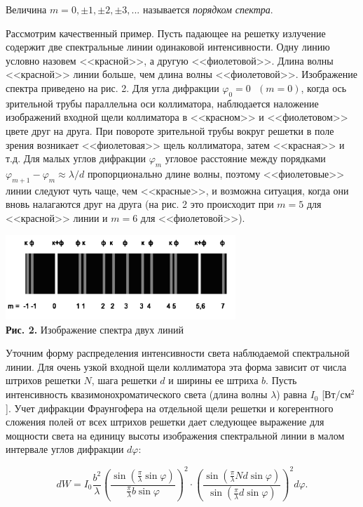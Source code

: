 \documentclass[a4paper,12pt]{article} %
\begin{document}
\hfill \break Величина $m = 0, \pm 1, \pm 2, \pm 3, ...$ называется \textit{порядком спектра}.

\hfill \break Рассмотрим качественный пример. Пусть падающее на решетку излучение содержит две спектральные линии одинаковой интенсивности. Одну линию условно назовем <<красной>>, а другую <<фиолетовой>>. Длина волны <<красной>> линии больше, чем длина волны <<фиолетовой>>. Изображение спектра приведено на рис. 2. Для угла дифракции $\varphi_{0} = 0 \text{ } (m = 0)$, когда ось зрительной трубы параллельна оси коллиматора, наблюдается наложение изображений входной щели коллиматора в <<красном>> и <<фиолетовом>> цвете друг на друга. При повороте зрительной трубы вокруг решетки в поле зрения возникает <<фиолетовая>> щель коллиматора, затем <<красная>> и т.д. Для малых углов дифракции $\varphi_{m}$ угловое расстояние между порядками $\varphi_{m+1} - \varphi_{m} \approx \lambda/d$ пропорционально длине волны, поэтому <<фиолетовые>> линии следуют чуть чаще, чем <<красные>>, и возможна ситуация, когда они вновь налагаются друг на друга (на рис. 2 это происходит при  $m = 5$ для <<красной>> линии и $m = 6$ для <<фиолетовой>>).

\begin{center}
\includegraphics[width=0.65\textwidth]{4.4.1_2.png}\\
\textbf{Рис. 2.}  Изображение спектра двух линий\\ 
\end{center}

\hfill \break Уточним форму распределения интенсивности света наблюдаемой спектральной линии. Для очень узкой входной щели коллиматора эта форма зависит от числа штрихов решетки $N$, шага решетки $d$ и ширины ее штриха $b$. Пусть интенсивность квазимонохроматического света (длина волны $\lambda$) равна $I_{0}$ [Вт/$\text{см}^2$]. Учет дифракции Фраунгофера на отдельной щели решетки и когерентного сложения полей от всех штрихов решетки дает следующее выражение для мощности света на единицу высоты изображения спектральной линии в малом интервале углов дифракции $d\varphi$:

$$
dW = I_{0} \frac{b^2}{\lambda} \left( \frac{\sin{\left(\frac{\pi}{\lambda}\sin{\varphi} \right)}}{\frac{\pi}{\lambda} b\sin{\varphi}}\right)^2 \cdot \left( \frac{ \sin{ \left( \frac{\pi}{\lambda} Nd\sin{\varphi} \right) } } { \sin{ \left( \frac{\pi}{\lambda} d \sin{\varphi} \right) } } \right)^2 d\varphi.
$$
\end{document}
